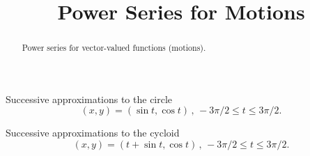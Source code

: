\documentclass{ximera}
\title{Power Series for Motions}
\begin{document}
\begin{abstract}
Power series for vector-valued functions (motions).
\end{abstract}
\maketitle



\begin{exploration}
Successive approximations to the circle
\[
    (x,y) = (\sin t, \cos t) \, , \, -3\pi/2 \leq t \leq 3\pi/2 .
\]


 
\begin{onlineOnly}
    \begin{center}
\end{center}
\end{onlineOnly}
\end{exploration}






\begin{exploration}
Successive approximations to the cycloid
\[
    (x,y) = (t +\sin t, \cos t) \, , \, -3\pi/2 \leq t \leq 3\pi/2 .
\]


 
\begin{onlineOnly}
    \begin{center}
\end{center}
\end{onlineOnly}
\end{exploration}
\end{document}
